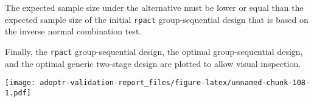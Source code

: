 \documentclass[
]{book}
\newenvironment{Shaded}{\begin{snugshade}}{\end{snugshade}}
\newcommand{\DecValTok}[1]{\textcolor[rgb]{0.00,0.00,0.81}{#1}}
\newcommand{\KeywordTok}[1]{\textcolor[rgb]{0.13,0.29,0.53}{\textbf{#1}}}
\newcommand{\NormalTok}[1]{#1}
\newcommand{\OperatorTok}[1]{\textcolor[rgb]{0.81,0.36,0.00}{\textbf{#1}}}
\newcommand{\StringTok}[1]{\textcolor[rgb]{0.31,0.60,0.02}{#1}}
\begin{document}
The expected sample size under the alternative must be lower or equal than
the expected sample size of the initial \texttt{rpact} group-sequential design that
is based on the inverse normal combination test.

\begin{Shaded}
\end{Shaded}

Finally, the \texttt{rpact} group-sequential design,
the optimal group-sequential design, and the optimal generic two-stage design
are plotted to allow visual inspection.

\texttt{[image: adoptr-validation-report\_files/figure-latex/unnamed-chunk-108-1.pdf]}

  
\end{document}
